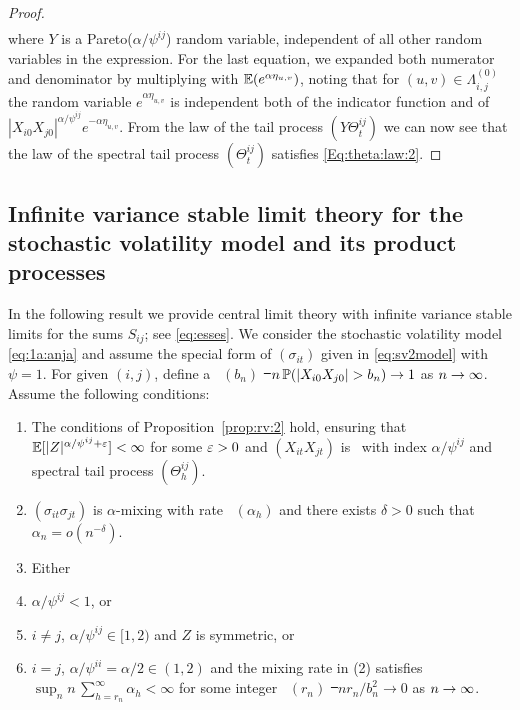 \begin{proof}
\begin{eqnarray*}
\end{eqnarray*}
where $Y$ is a Pareto($\alpha/\psi^{ij}$) random variable, independent of all other random variables in the expression. For the last equation, we expanded both numerator and denominator by multiplying with ${\mathbb E}(e^{\alpha \eta_{u,v}})$, noting that for $(u,v) \in \Lambda_{i,j}^{(0)}$ the random variable $e^{\alpha \eta_{u,v}}$ is independent both of the indicator function and of $|X_{i0}X_{j0}|^{\alpha/\psi^{ij}}e^{-\alpha \eta_{u,v}}$. From the law of the tail process $(Y \Theta_t^{ij})$ we can now see that the law of the spectral tail process $(\Theta_t^{ij})$ satisfies \eqref{Eq:theta:law:2}.
\end{proof}

\subsection{Infinite variance stable limit theory for the stochastic volatility model and its product processes}\label{subsec:limit2}
In the following result we provide central limit theory with infinite variance stable limits for the sums $S_{ij}$; see \eqref{eq:esses}.
\bth\label{thm:1}
We consider the stochastic volatility model \eqref{eq:1a:anja} and assume the special form of $(\sigma_{it})$ given in \eqref{eq:sv2model} with $\psi=1$. 
For given $(i,j)$, define a \seq\ $(b_n)$ \st\ 
$n\,\P(|X_{i0}X_{j0}|>b_n)\to 1$ as $n\to\infty$.
Assume the following conditions:
\begin{enumerate}
\item 
The conditions of Proposition~\ref{prop:rv:2} hold, ensuring that ${\mathbb E}[|Z|^{\alpha/\psi^{ij}+\varepsilon}]<\infty$ for some $\varepsilon>0$ and
$(X_{it}X_{jt})$ is \regvary\ with index $\alpha/\psi^{ij}$ and spectral tail process $(\Theta_h^{ij})$.
\item
$(\sigma_{it}\sigma_{jt})$ is $\alpha$-mixing with rate \fct\ $(\alpha_h)$ and there exists $\delta>0$ such that $\alpha_n=o(n^{-\delta})$.
\item Either 
\item[(i)]$\alpha/\psi^{ij}< 1$, or 
\item[(ii)] 
$i\ne j$, $\alpha/\psi^{ij}\in [1,2)$ and $Z$ is symmetric, or 
\item[(iii)] $i=j$,
$\alpha/\psi^{ii}=\alpha/2 \in (1,2)$ and the mixing rate in (2)
satisfies 
$\sup _n n\,\sum_{h=r_n}^\infty \alpha_h<\infty$ for some integer \seq\ $(r_n)$ \st\ $nr_n/b_n^2\to 0$ as $n\to\infty$.
\end{enumerate}

